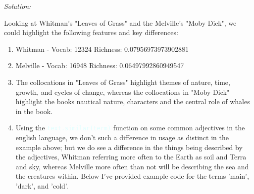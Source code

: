 \documentclass[11pt]{article}
\newenvironment{solution}{
	\vspace{10px}\noindent\emph{Solution:}
}{
	\vspace{10px}
}
\newcommand{\codeword}[1]{
	\texttt{\textcolor{lightCyan}{#1}}
}
\begin{document}
\begin{solution}
	Looking at Whitman's "Leaves of Grass" and the Melville's "Moby Dick", we could highlight the following features and key differences: 
	\begin{enumerate}
		
		\item Whitman - Vocab:  12324  Richness:  0.07956973973902881
		
		\item Melville - Vocab:  16948  Richness:  0.06497992860949547
		
		\item The collocations in "Leaves of Grass" highlight themes of nature, time, growth, and cycles of change, whereas the collocations in "Moby Dick" highlight the books nautical nature, characters and the central role of whales in the book.
		
		\item Using the \codeword{text.similar(term)} function on some common adjectives in the english language, we don't such a difference in usage as distinct in the example above; but we do see a difference in the things being described by the adjectives, Whitman referring more often to the Earth as soil and Terra and sky, whereas Melville more often than not will be describing the sea and the creatures within. Below I've provided example code for the terms 'main', 'dark', and 'cold'.
	
	\end{enumerate}
	

\end{solution}
\end{document}
